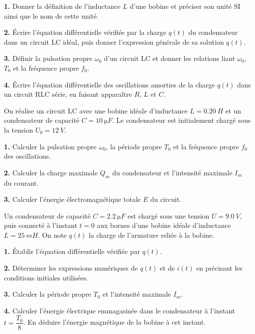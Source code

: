 \documentclass[11pt]{article}
\newcommand{\cle}[1]{{\popxbold\color{popdark}#1}}
\newcounter{popsec}
\newcounter{popsub}
\newcommand{\courssub}[1]{%
  \stepcounter{popsub}%
  \par\vspace{9pt}\noindent{\popxbold\fontsize{11.5}{13}\selectfont\color{popink}{\color{poporange}\thepopsec.\thepopsub}\hspace{6pt}#1}\par\nopagebreak\vspace{4pt}
}
\begin{document}
\begin{exercice}
\textbf{1.} Donner la définition de l'inductance $L$ d'une bobine et préciser son unité SI ainsi que le nom de cette unité.

\textbf{2.} Écrire l'équation différentielle vérifiée par la charge $q(t)$ du condensateur dans un circuit LC idéal, puis donner l'expression générale de sa solution $q(t)$.

\textbf{3.} Définir la \cle{pulsation propre} $\omega_0$ d'un circuit LC et donner les relations liant $\omega_0$, $T_0$ et la fréquence propre $f_0$.

\textbf{4.} Écrire l'équation différentielle des oscillations amorties de la charge $q(t)$ dans un circuit RLC série, en faisant apparaître $R$, $L$ et $C$.
\end{exercice}

\begin{exercice}
On réalise un circuit LC avec une bobine idéale d'inductance $L = \SI{0,20}{H}$ et un condensateur de capacité $C = \SI{10}{\micro F}$. Le condensateur est initialement chargé sous la tension $U_0 = \SI{12}{V}$.

\textbf{1.} Calculer la pulsation propre $\omega_0$, la période propre $T_0$ et la fréquence propre $f_0$ des oscillations.

\textbf{2.} Calculer la charge maximale $Q_m$ du condensateur et l'intensité maximale $I_m$ du courant.

\textbf{3.} Calculer l'énergie électromagnétique totale $E$ du circuit.
\end{exercice}

\courssub{Je m'entraîne}

\begin{exercice}
Un condensateur de capacité $C = \SI{2,2}{\micro F}$ est chargé sous une tension $U = \SI{9,0}{V}$, puis connecté à l'instant $t = 0$ aux bornes d'une bobine idéale d'inductance $L = \SI{25}{mH}$. On note $q(t)$ la charge de l'armature reliée à la bobine.

\textbf{1.} Établir l'équation différentielle vérifiée par $q(t)$.

\textbf{2.} Déterminer les expressions numériques de $q(t)$ et de $i(t)$ en précisant les conditions initiales utilisées.

\textbf{3.} Calculer la période propre $T_0$ et l'intensité maximale $I_m$.

\textbf{4.} Calculer l'énergie électrique emmagasinée dans le condensateur à l'instant $t = \dfrac{T_0}{8}$. En déduire l'énergie magnétique de la bobine à cet instant.
\end{exercice}
\end{document}
